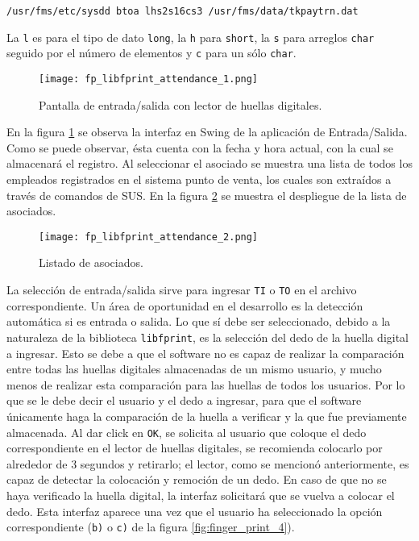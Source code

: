 \texttt{/usr/fms/etc/sysdd btoa lhs2s16cs3 /usr/fms/data/tkpaytrn.dat}

La \texttt{l} es para el tipo de dato \texttt{long}, la \texttt{h} para \texttt{short}, la \texttt{s} para arreglos \texttt{char} seguido por el número de elementos y \texttt{c} para un sólo \texttt{char}.

\begin{figure}[htb]
 \begin{center}
  \texttt{[image: fp\_libfprint\_attendance\_1.png]}
 \end{center}
 \caption{Pantalla de entrada/salida con lector de huellas digitales.}
 \label{fig:finger_print_5}
\end{figure}


En la figura \ref{fig:finger_print_5} se observa la interfaz en Swing de la aplicación de Entrada/Salida. Como se puede observar, ésta cuenta con la fecha y hora actual, con la cual se almacenará el registro. Al seleccionar el asociado se muestra una lista de todos los empleados registrados en el sistema punto de venta, los cuales son extraídos a través de comandos de SUS. En la figura \ref{fig:finger_print_6} se muestra el despliegue de la lista de asociados.

\begin{figure}[htb]
 \begin{center}
  \texttt{[image: fp\_libfprint\_attendance\_2.png]}
 \end{center}
 \caption{Listado de asociados.}
 \label{fig:finger_print_6}
\end{figure}

La selección de entrada/salida sirve para ingresar \texttt{TI} o \texttt{TO} en el archivo correspondiente. Un área de oportunidad en el desarrollo es la detección automática si es entrada o salida. Lo que sí debe ser seleccionado, debido a la naturaleza de la biblioteca \texttt{libfprint}, es la selección del dedo de la huella digital a ingresar. Esto se debe a que el software no es capaz de realizar la comparación entre todas las huellas digitales almacenadas de un mismo usuario, y mucho menos de realizar esta comparación para las huellas de todos los usuarios. Por lo que se le debe decir el usuario y el dedo a ingresar, para que el software únicamente haga la comparación de la huella a verificar y la que fue previamente almacenada. Al dar click en \texttt{OK}, se solicita al usuario que coloque el dedo correspondiente en el lector de huellas digitales, se recomienda colocarlo por alrededor de 3 segundos y retirarlo; el lector, como se mencionó anteriormente, es capaz de detectar la colocación  y remoción de un dedo. En caso de que no se haya verificado la huella digital, la interfaz solicitará que se vuelva a colocar el dedo. Esta interfaz aparece una vez que el usuario ha seleccionado la opción correspondiente (\texttt{b)} o \texttt{c)} de la figura \ref{fig:finger_print_4}).

